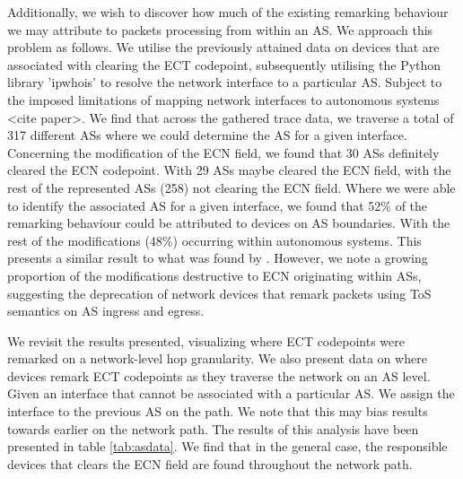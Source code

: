 \documentclass{l4proj}
\begin{document}
Additionally, we wish to discover how much of the existing remarking behaviour we may attribute to packets processing from within an AS. We approach this problem as follows. We utilise the previously attained data on devices that are associated with clearing the ECT codepoint, subsequently utilising the Python library 'ipwhois' to resolve the network interface to a particular AS. Subject to the imposed limitations of mapping network interfaces to autonomous systems <cite paper>. We find that across the gathered trace data, we traverse a total of 317 different ASs where we could determine the AS for a given interface. Concerning the modification of the ECN field, we found that 30 ASs definitely cleared the ECN codepoint. With 29 ASs maybe cleared the ECN field, with the rest of the represented ASs (258) not clearing the ECN field. Where we were able to identify the associated AS for a given interface, we found that 52\% of the remarking behaviour could be attributed to devices on AS boundaries. With the rest of the modifications (48\%) occurring within autonomous systems. This presents a similar result to what was found by \cite{mcquistin_is_2015}. However, we note a growing proportion of the modifications destructive to ECN originating within ASs, suggesting the deprecation of network devices that remark packets using ToS semantics on AS ingress and egress.

We revisit the results presented, visualizing where ECT codepoints were remarked on a network-level hop granularity. We also present data on where devices remark ECT codepoints as they traverse the network on an AS level. Given an interface that cannot be associated with a particular AS. We assign the interface to the previous AS on the path. We note that this may bias results towards earlier on the network path. The results of this analysis have been presented in table \ref{tab:asdata}. We find that in the general case, the responsible devices that clears the ECN field are found throughout the network path.
\end{document}
